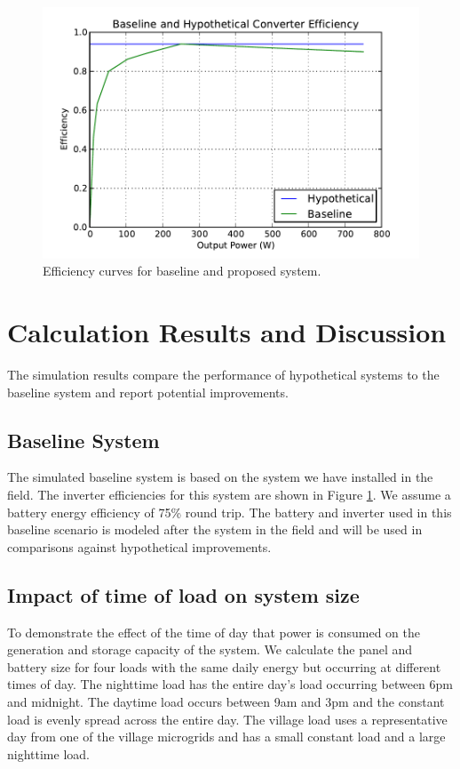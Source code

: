 \documentclass[conference]{IEEEtran}
\begin{document}
\begin{figure}[]
\begin{center}
\includegraphics[width=\columnwidth]{figures/inverter_curves.pdf}
\end{center}
\caption{Efficiency curves for baseline and proposed system.}
\label{inverter_curves}
\end{figure}

\section{Calculation Results and Discussion}

The simulation results compare the performance of hypothetical
systems to the baseline system and report potential improvements.

\subsection{Baseline System}
The simulated baseline system is based on the system we have
installed in the field.
The inverter efficiencies for this system are shown in Figure
\ref{inverter_curves}.
We assume a battery energy efficiency of 75\% round trip.
The battery and inverter used in this baseline scenario
is modeled after the system in the field and will be used
in comparisons against hypothetical improvements.

\subsection{Impact of time of load on system size}

To demonstrate the effect of the time of day that power
is consumed on the generation and storage capacity of the system.
We calculate the panel and battery size for four loads with
the same daily energy but occurring at different times of day.
The nighttime load has the entire day's load occurring between
6pm and midnight.
The daytime load occurs between 9am and 3pm and the constant
load is evenly spread across the entire day.
The village load uses a representative day from one of the
village microgrids and has a small constant load and a large
nighttime load.
\end{document}
